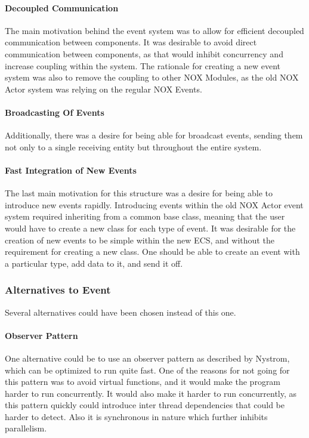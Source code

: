 \paragraph{Decoupled Communication}
The main motivation behind the event system was to allow for efficient decoupled communication between components.
It was desirable to avoid direct communication between components, as that would inhibit concurrency and increase coupling within the system.
The rationale for creating a new event system was also to remove the coupling to other NOX Modules, as the old NOX Actor system was relying on the regular NOX Events.

\paragraph{Broadcasting Of Events}
Additionally, there was a desire for being able for broadcast events, sending them not only to a single receiving entity but throughout the entire system.

\paragraph{Fast Integration of New Events}
The last main motivation for this structure was a desire for being able to introduce new events rapidly.
Introducing events within the old NOX Actor event system required inheriting from a common base class, meaning that the user would have to create a new class for each type of event.
It was desirable for the creation of new events to be simple within the new ECS, and without the requirement for creating a new class. 
One should be able to create an event with a particular type, add data to it, and send it off.

\subsubsection{Alternatives to Event}
Several alternatives could have been chosen instead of this one.

\paragraph{Observer Pattern}
One alternative could be to use an observer pattern as described by Nystrom\cite[Observer]{game_programming_patterns},
which can be optimized to run quite fast.
One of the reasons for not going for this pattern was to avoid virtual functions,
and it would make the program harder to run concurrently.
It would also make it harder to run concurrently,
as this pattern quickly could introduce inter thread dependencies
that could be harder to detect.
Also it is synchronous in nature which further inhibits parallelism.

